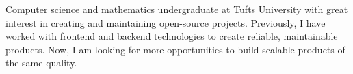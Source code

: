 Computer science and mathematics undergraduate at Tufts University with great
interest in creating and maintaining open-source projects. Previously, I have
worked with frontend and backend technologies to create reliable, maintainable
products. Now, I am looking for more opportunities to build
scalable products of the same quality.